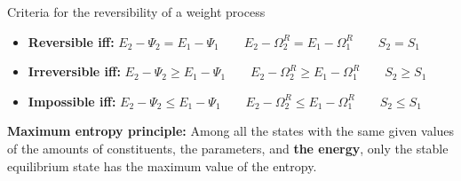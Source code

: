\begin{corollary}
    Criteria for the reversibility of a weight process
    \begin{itemize}
        \item \textbf{Reversible iff:} \( E_2 - \Psi_2 = E_1 - \Psi_1 \qquad
        E_2 - \Omega^R_2 = E_1 - \Omega^R_1 \qquad S_2=S_1\)
        \item \textbf{Irreversible iff:} \( E_2 - \Psi_2 \geq E_1 - \Psi_1 \qquad
        E_2 - \Omega^R_2 \geq E_1 - \Omega^R_1 \qquad S_2\geq S_1 \)
        \item \textbf{Impossible iff:} \( E_2 - \Psi_2 \leq E_1 - \Psi_1 \qquad
        E_2 - \Omega^R_2 \leq E_1 - \Omega^R_1 \qquad S_2\leq S_1 \)
    \end{itemize}
\end{corollary}
\begin{thm}
    
\end{thm}

\textbf{Maximum entropy principle:} Among all the states with the same given values of the amounts of constituents, the parameters, and \textbf{the energy}, only the stable equilibrium state has the maximum value of the entropy.

